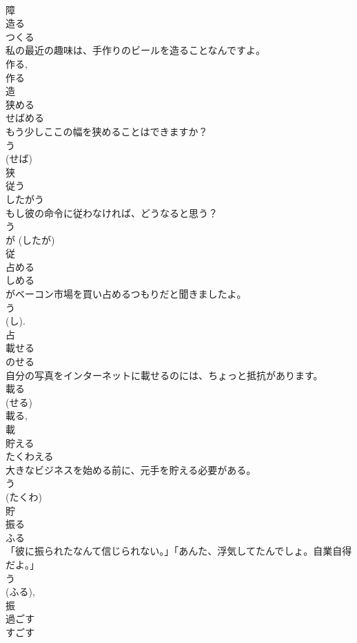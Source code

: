 \documentclass[8pt]{extreport}
\begin{document}
\begin{CJK}{UTF8}{min}
\\	障	
\\	造る	
\\	つくる	
\\	私の最近の趣味は、手作りのビールを造ることなんですよ。	
\\	作る, 
\\	作る 
\\	造	
\\	狭める	
\\	せばめる	
\\	もう少しここの幅を狭めることはできますか？	
\\	う 
\\	(せば) 
\\	狭	
\\	従う	
\\	したがう	
\\	もし彼の命令に従わなければ、どうなると思う？	
\\	う 
\\	が (したが) 
\\	従	
\\	占める	
\\	しめる	
\\	がベーコン市場を買い占めるつもりだと聞きましたよ。	
\\	う 
\\	(し). 
\\	占	
\\	載せる	
\\	のせる	
\\	自分の写真をインターネットに載せるのには、ちょっと抵抗があります。	
\\	載る 
\\	(せる) 
\\	載る, 
\\	載	
\\	貯える	
\\	たくわえる	
\\	大きなビジネスを始める前に、元手を貯える必要がある。	
\\	う 
\\	(たくわ) 
\\	貯	
\\	振る	
\\	ふる	
\\	「彼に振られたなんて信じられない。」「あんた、浮気してたんでしょ。自業自得だよ。」	
\\	う 
\\	(ふる), 
\\	振	
\\	過ごす	
\\	すごす	

\end{CJK}
\end{document}
